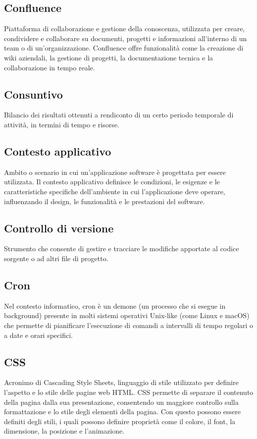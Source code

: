 \hypertarget{sec:confluence}{}
\subsection*{Confluence}
Piattaforma di collaborazione e gestione della conoscenza, utilizzata per creare, condividere e collaborare su documenti, progetti e informazioni all'interno 
di un team o di un'organizzazione. Confluence offre funzionalità come la creazione di wiki aziendali, la gestione di progetti, la documentazione tecnica e la 
collaborazione in tempo reale.

\hypertarget{sec:consuntivo}{}
\subsection*{Consuntivo}
Bilancio dei risultati ottenuti a rendiconto di un certo periodo temporale di attività, in termini di tempo e risorse.

\hypertarget{sec:contesto_applicativo}{}
\subsection*{Contesto applicativo}
Ambito o scenario in cui un'applicazione software è progettata per essere utilizzata. Il contesto applicativo definisce le condizioni, le esigenze e le
caratteristiche specifiche dell'ambiente in cui l'applicazione deve operare, influenzando il design, le funzionalità e le prestazioni del software.

\hypertarget{sec:controllo_versione}{}
\subsection*{Controllo di versione}
Strumento che consente di gestire e tracciare le modifiche apportate al codice sorgente o ad altri file di progetto.

\hypertarget{sec:cron}{}
\subsection*{Cron}
Nel contesto informatico, cron è un demone (un processo che si esegue in background) presente in molti sistemi operativi Unix-like 
(come Linux e macOS) che permette di pianificare l'esecuzione di comandi a intervalli di tempo regolari o a date e orari specifici.

\hypertarget{sec:css}{}
\subsection*{CSS}
Acronimo di Cascading Style Sheets, linguaggio di stile utilizzato per definire l’aspetto e lo stile delle pagine web HTML. CSS 
permette di separare il contenuto della pagina dalla sua presentazione, consentendo un maggiore controllo sulla formattazione e lo 
stile degli elementi della pagina. Con questo possono essere definiti degli stili, i quali possono definire proprietà come il colore, 
il font, la dimensione, la posizione e l’animazione.

\newpage